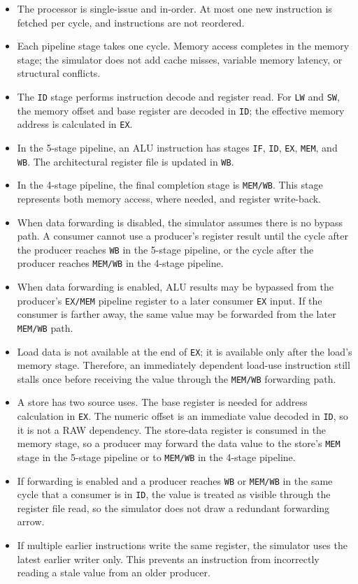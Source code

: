\documentclass[11pt,a4paper]{article}
\begin{document}
\begin{itemize}[leftmargin=*]
    \item The processor is single-issue and in-order. At most one new instruction is fetched per cycle, and instructions are not reordered.
    \item Each pipeline stage takes one cycle. Memory access completes in the memory stage; the simulator does not add cache misses, variable memory latency, or structural conflicts.
    \item The \texttt{ID} stage performs instruction decode and register read. For \texttt{LW} and \texttt{SW}, the memory offset and base register are decoded in \texttt{ID}; the effective memory address is calculated in \texttt{EX}.
    \item In the 5-stage pipeline, an ALU instruction has stages \texttt{IF}, \texttt{ID}, \texttt{EX}, \texttt{MEM}, and \texttt{WB}. The architectural register file is updated in \texttt{WB}.
    \item In the 4-stage pipeline, the final completion stage is \texttt{MEM/WB}. This stage represents both memory access, where needed, and register write-back.
    \item When data forwarding is disabled, the simulator assumes there is no bypass path. A consumer cannot use a producer's register result until the cycle after the producer reaches \texttt{WB} in the 5-stage pipeline, or the cycle after the producer reaches \texttt{MEM/WB} in the 4-stage pipeline.
    \item When data forwarding is enabled, ALU results may be bypassed from the producer's \texttt{EX/MEM} pipeline register to a later consumer \texttt{EX} input. If the consumer is farther away, the same value may be forwarded from the later \texttt{MEM/WB} path.
    \item Load data is not available at the end of \texttt{EX}; it is available only after the load's memory stage. Therefore, an immediately dependent load-use instruction still stalls once before receiving the value through the \texttt{MEM/WB} forwarding path.
    \item A store has two source uses. The base register is needed for address calculation in \texttt{EX}. The numeric offset is an immediate value decoded in \texttt{ID}, so it is not a RAW dependency. The store-data register is consumed in the memory stage, so a producer may forward the data value to the store's \texttt{MEM} stage in the 5-stage pipeline or to \texttt{MEM/WB} in the 4-stage pipeline.
    \item If forwarding is enabled and a producer reaches \texttt{WB} or \texttt{MEM/WB} in the same cycle that a consumer is in \texttt{ID}, the value is treated as visible through the register file read, so the simulator does not draw a redundant forwarding arrow.
    \item If multiple earlier instructions write the same register, the simulator uses the latest earlier writer only. This prevents an instruction from incorrectly reading a stale value from an older producer.
\end{itemize}
\end{document}
